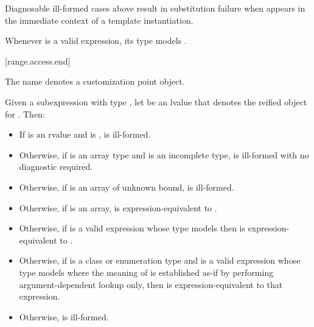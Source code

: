 \pnum
\begin{note}
Diagnosable ill-formed cases above
result in substitution failure when 
appears in the immediate context of a template instantiation.
\end{note}

\pnum
\begin{note}
Whenever  is a valid expression, its type models
.
\end{note}

[range.access.end]{}
%

\pnum
The name  denotes a customization point
object.

\pnum
Given a subexpression  with type ,
let  be an lvalue that denotes the reified object for .
Then:

\begin{itemize}
\item
  If  is an rvalue and
   is ,
   is ill-formed.

\item
  Otherwise, if  is an array type and
   is an incomplete type,
   is ill-formed with no diagnostic required.

\item
  Otherwise, if  is an array of unknown bound,
   is ill-formed.

\item
  Otherwise, if  is an array,
   is expression-equivalent to
  .

\item
  Otherwise, if 
  is a valid expression whose type models
  then  is expression-equivalent to
  .

\item
  Otherwise, if  is a class or enumeration type and
  is a valid expression whose type models
  where the meaning of  is established as-if by performing
  argument-dependent lookup only,
  then  is expression-equivalent to
  that expression.

\item
  Otherwise,  is ill-formed.
\end{itemize}

